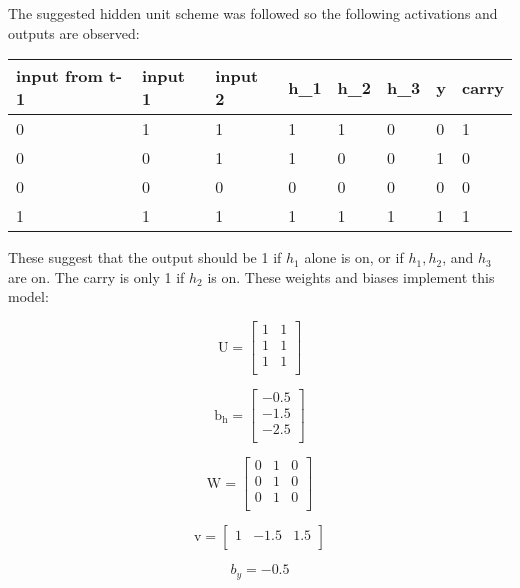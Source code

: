 \documentclass[12pt,letterpaper]{article} %
\newcommand{\bs}[1]{\bm{\mathrm{#1}}} %
\begin{document}
The suggested hidden unit scheme was followed so the following activations and outputs are observed:
\begin{table}[ht!]
\begin{tabular}{l|l|l|l|l|l|l|l}
input from t-1 & input 1 & input 2 & h\_1 & h\_2 & h\_3 & y & carry \\
\hline
0              & 1       & 1       & 1    & 1    & 0    & 0 & 1     \\
0              & 0       & 1       & 1    & 0    & 0    & 1 & 0     \\
0              & 0       & 0       & 0    & 0    & 0    & 0 & 0     \\
1              & 1       & 1       & 1    & 1    & 1    & 1 & 1    
\end{tabular}
\end{table}

These suggest that the output should be 1 if $h_1$ alone is on, or if $h_1, h_2$, and $h_3$ are on. The carry is only 1 if $h_2$ is on.   
These weights and biases implement this model:

\begin{equation*}
\bs{U} = \begin{bmatrix} 1 & 1 \\ 1 & 1 \\ 1 & 1 \\\end{bmatrix}
\end{equation*} 

\begin{equation*}
\bs{b_h} = \begin{bmatrix} -0.5  \\ -1.5 \\ -2.5 \\\end{bmatrix}
\end{equation*} 

\begin{equation*}
\bs{W} = \begin{bmatrix} 0 & 1 & 0 \\ 0 & 1 & 0 \\ 0 & 1 & 0\\\end{bmatrix}
\end{equation*} 

\begin{equation*}
\bs{v} = \begin{bmatrix} 1  & -1.5 & 1.5 \\\end{bmatrix}
\end{equation*} 

\begin{equation*}
b_y = -0.5
\end{equation*}

 
\end{document}

